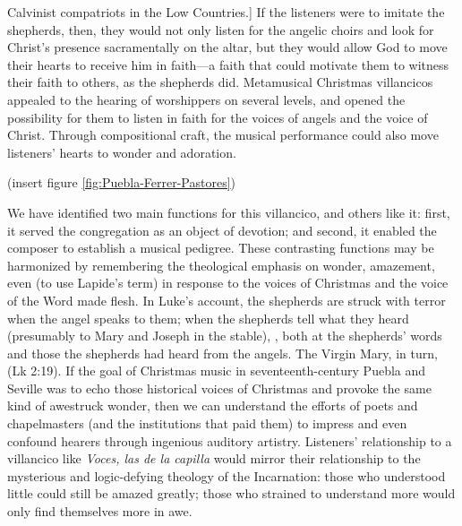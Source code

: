 Calvinist compatriots in the Low Countries.]
If the listeners were to imitate the shepherds, then, they would not only listen
for the angelic choirs and look for Christ's presence sacramentally on the
altar, but they would allow God to move their hearts to receive him in
faith---a faith that could motivate them to witness their faith to others, as
the shepherds did.
Metamusical Christmas villancicos appealed to the hearing of worshippers on
several levels, and opened the possibility for them to listen in faith for the
voices of angels and the voice of Christ.
Through compositional craft, the musical performance could also move listeners'
hearts to wonder and adoration.

(insert figure \ref{fig:Puebla-Ferrer-Pastores})
\label{fig:Puebla-Ferrer-Pastores}

We have identified two main functions for this villancico, and others like it:
first, it served the congregation as an object of devotion; and second, it
enabled the composer to establish a musical pedigree.
These contrasting functions may be harmonized by remembering the theological
emphasis on wonder, amazement, even  (to use Lapide's term) in
response to the voices of Christmas and the voice of the Word made
flesh.
In Luke's account, the shepherds are struck with terror when the angel speaks to
them; when the shepherds tell what they heard (presumably to Mary and Joseph
in the stable), , both at the shepherds' words and
those the shepherds had heard from the angels.
The Virgin Mary, in turn,  (Lk 2:19).
If the goal of Christmas music in seventeenth-century Puebla and Seville was to
echo those historical voices of Christmas and provoke the same kind of awestruck
wonder, then we can understand the efforts of poets and chapelmasters (and the
institutions that paid them) to impress and even confound hearers through
ingenious auditory artistry.
Listeners' relationship to a villancico like \emph{Voces, las de la capilla} would
mirror their relationship to the mysterious and logic-defying theology of the
Incarnation: those who understood little could still be amazed greatly; those
who strained to understand more would only find themselves more in awe.

